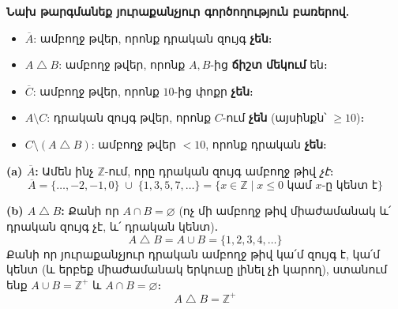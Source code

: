 \documentclass[12pt, a4paper]{article}
\newcommand{\Z}{\mathbb{Z}}
\newcommand{\comp}[1]{\overline{#1}}
\newcommand{\symdiff}{\mathbin{\triangle}}
\begin{document}
\begin{center}
\end{center}

\textbf{Նախ թարգմանեք յուրաքանչյուր գործողություն բառերով.}
\begin{itemize}[nosep]
  \item $\comp{A}$: ամբողջ թվեր, որոնք դրական զույգ \textbf{չեն}։
  \item $A \symdiff B$: ամբողջ թվեր, որոնք $A, B$-ից \textbf{ճիշտ մեկում} են։
  \item $\comp{C}$: ամբողջ թվեր, որոնք $10$-ից փոքր \textbf{չեն}։
  \item $A \setminus C$: դրական զույգ թվեր, որոնք $C$-ում \textbf{չեն} (այսինքն՝ $\ge 10$)։
  \item $C \setminus (A \symdiff B)$: ամբողջ թվեր $< 10$, որոնք դրական \textbf{չեն}։
\end{itemize}

\medskip
\textbf{(a)\; $\comp{A}$:}\;
Ամեն ինչ $\Z$-ում, որը դրական զույգ ամբողջ թիվ \emph{չէ}։
\[
  \boxed{\comp{A} = \{\ldots, -2, -1, 0\} \;\cup\; \{1, 3, 5, 7, \ldots\}
         = \bigl\{x \in \Z \mid x \le 0 \text{ կամ } x \text{-ը կենտ է}\bigr\}}
\]

\textbf{(b)\; $A \symdiff B$:}\;
Քանի որ $A \cap B = \varnothing$ (ոչ մի ամբողջ թիվ միաժամանակ և՛ դրական զույգ չէ, և՛ դրական կենտ)․
\[
  A \symdiff B = A \cup B = \{1, 2, 3, 4, \ldots\}
\]
Քանի որ յուրաքանչյուր դրական ամբողջ թիվ կա՛մ զույգ է, կա՛մ կենտ (և երբեք միաժամանակ երկուսը լինել չի կարող), ստանում ենք $A \cup B = \Z^+$ և $A \cap B = \varnothing$։
\[
  \boxed{A \symdiff B = \Z^+}
\]
\end{document}

